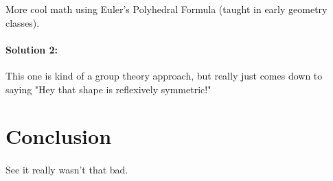 \documentclass[12pt,letter]{article}
\begin{document}
More cool math using Euler's Polyhedral Formula (taught in early geometry classes). \cite{Mannige:2008}

\paragraph{Solution 2:}
This one is kind of a group theory approach, but really just comes down to saying "Hey that shape is reflexively symmetric!" \cite{Manning:2008}

\section{Conclusion}
\paragraph{}
See it really wasn't that bad.

\newpage


\end{document}
